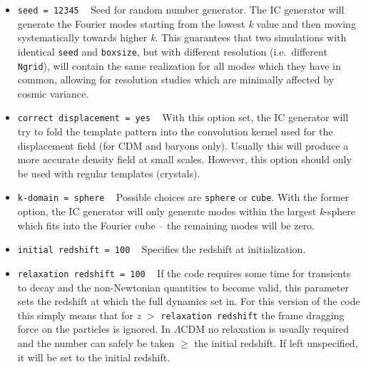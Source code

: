 \documentclass[a4paper,10pt]{article}
\begin{document}
\begin{itemize}
 \item[] \hspace{-25pt}\texttt{seed = 12345} ~ Seed for random number generator. The IC generator will generate the Fourier modes starting
 from the lowest \textit{k} value and then moving systematically towards higher \textit{k}. This guarantees that two simulations with
 identical \texttt{seed} and \texttt{boxsize}, but with different resolution (i.e.\ different \texttt{Ngrid}), will contain the same
 realization for all modes which they have in common, allowing for resolution studies which are minimally affected by cosmic variance.
 \item[] \hspace{-25pt}\texttt{correct displacement = yes} ~ With this option set, the IC generator will try to fold the template pattern
 into the convolution kernel used for the displacement field (for CDM and baryons only). Usually this will produce a more accurate density
 field at small scales. However, this option should only be used with regular templates (crystals).
 \item[] \hspace{-25pt}\texttt{k-domain = sphere} ~ Possible choices are \texttt{sphere} or \texttt{cube}. With the former option, the IC
 generator will only generate modes within the largest \textit{k}-sphere which fits into the Fourier cube -- the remaining modes will be
 zero.
 \item[] \hspace{-25pt}\texttt{initial redshift = 100} ~ Specifies the redshift at initialization.
 \item[] \hspace{-25pt}\texttt{relaxation redshift = 100} ~ If the code requires some time for transients to decay and the non-Newtonian
 quantities to become valid, this parameter sets the redshift at which the full dynamics set in. For this version of the code this simply
 means that for \textit{z} $>$ \texttt{relaxation redshift} the frame dragging force on the particles is ignored. In $\mathsf{\Lambda}$CDM
 no relaxation is usually required and the number can safely be taken $\geq$ the initial redshift. If left unspecified, it will be set to
 the initial redshift.


\end{itemize}
\end{document}
